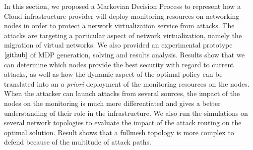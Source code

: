 \label{sec:mdp-conclusion}
In this section, we proposed a Markovian Decision Process to represent how a Cloud infrastructure provider will deploy monitoring resources on networking nodes in order to protect a network virtualization service from attacks.
The attacks are targeting a particular aspect of network virtualization, namely the migration of virtual networks.
We also provided an experimental prototype$\ref{github}$ of MDP generation, solving and results analysis.
Results show that we can determine which nodes provide the best security with regard to current attacks, as well as how the dynamic aspect of the optimal policy can be translated into an \textit{a priori} deployment of the monitoring resources on the nodes.
When the attacker can launch attacks from several sources, the impact of the nodes on the monitoring is much more differentiated and gives a better understanding of their role in the infrastructure.
We also run the simulations on several network topologies to evaluate the impact of the attack routing on the optimal solution. Result shows that a fullmesh topology is more complex to defend because of the multitude of attack paths.